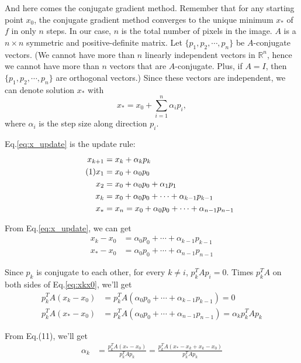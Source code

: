 \documentclass{article}
\newcommand\numberthis{\addtocounter{equation}{1}\tag{\theequation}}
\begin{document}
And here comes the conjugate gradient method. Remember that for any starting point $x_0$, the conjugate gradient method converges to the unique minimum $x_*$ of $f$ in only $n$ steps. In our case, $n$ is the total number of pixels in the image. $A$ is a $n\times n$ symmetric and positive-definite matrix. Let $\{ p_1,  p_2,\cdots, p_n\}$ be $A$-conjugate vectors. (We cannot have more than $n$ linearly independent vectors in $\mathbb{R}^n$, hence we cannot have more than $n$ vectors that are $A$-conjugate. Plus, if $A=I$, then $\{ p_1,  p_2,\cdots, p_n\}$ are orthogonal vectors.) Since these vectors are independent, we can denote solution $ x_*$ with 
\begin{equation}
    x_*=x_0+\sum_{i=1}^n\alpha_i  p_i,
\end{equation}
where $\alpha_i$ is the step size along direction $ p_i$. 

Eq.\eqref{eq:x_update} is the update rule:
\begin{align*}
    x_{k+1}&=x_k+\alpha_k p_k \\ \numberthis \label{eq:x_update}
    x_{1}&=x_0+\alpha_0 p_0   \\ 
    x_{2}&=x_0+\alpha_0 p_0+\alpha_1 p_1 \\ 
    x_{k}&=x_0+\alpha_0 p_0+\cdots+\alpha_{k-1} p_{k-1} \\ 
    x_{*}&=x_{n}=x_0+\alpha_0 p_0+\cdots+\alpha_{n-1} p_{n-1}
\end{align*}

From Eq.\eqref{eq:x_update}, we can get
\begin{align}
    x_{k}-x_{0}&=\alpha_0 p_0+\cdots+\alpha_{k-1} p_{k-1}\\ \label{eq:xkx0}
    x_{*}-x_{0}&=\alpha_0 p_0+\cdots+\alpha_{n-1} p_{n-1}
\end{align}

 Since $ p_k$ is conjugate to each other, for every $k\not=i$, $ p_k^TA  p_i=0$. Times $ p_{k}^TA$ on both sides of Eq.\eqref{eq:xkx0}, we'll get
\begin{align}
     p_{k}^TA(x_{k}-x_{0})&= p_{k}^TA(\alpha_0 p_0+\cdots+\alpha_{k-1} p_{k-1})=0\\
     p_{k}^TA(x_{*}-x_{0})&= p_{k}^TA(\alpha_0 p_0+\cdots+\alpha_{n-1} p_{n-1})=\alpha_k p_{k}^TA p_{k}
\end{align}

From Eq.(11), we'll get
\begin{align}
    \alpha_k&=\frac{ p_{k}^TA(x_{*}-x_{0})}{ p_{k}^TA p_{k}}=\frac{ p_{k}^TA(x_{*}-x_{k}+x_{k}-x_{0})}{ p_{k}^TA p_{k}}
\end{align}
\end{document}
